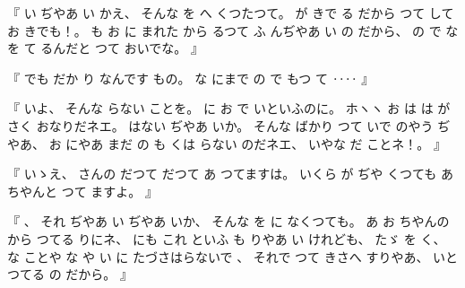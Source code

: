 %
『
い
ぢやあ
い
かえ、
%
そんな
を
へ
くつたつて。
%
が
きで
る
だから
つて
して
お
きでも！。
%
も
お
に
まれた
から
るつて
ふ
んぢやあ
い
の
だから、
%
の
で
な
を
て
るんだと
つて
おいでな。
』

%
『
でも
だか
り
なんです
もの。
%
な
にまで
の
で%
もつ
て
‥‥
』

%
『
いよ、
%
そんな
らない
ことを。
%
に
お
で
いといふのに。
%
ホヽヽ
お
は
は
が
さく
おなりだネエ。
%
はない
ぢやあ
いか。
%
そんな
ばかり
つて
いで
のやう
ぢやあ、
%
お
にやあ
まだ
の
も
くは
らない
のだネエ、
%
いやな
だ
ことネ！。
』

%
『
いゝえ、
%
さんの
だつて
だつて
あ
つてますは。
%
%
いくら
が
ぢや
くつても
あ
ちやんと
つて
ますよ。
』

%
『
、
%
それ
ぢやあ
い
ぢやあ
いか、
%
そんな
を
に
なくつても。
%
あ
お
ちやんの
から
つてる
りにネ、
%
にも
これ
といふ
も
りやあ
い
けれども、
%
たゞ
を
く、
%
な
ことや
な
や
い
に
たづさはらないで
、
%
%
それで
つて%
きさへ
すりやあ、
%
いと
つてる
の
だから。
』

